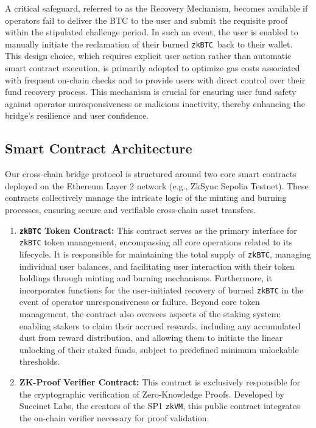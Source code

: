 \documentclass{DESSThesis}
\newcommand{\zktoken}{\texttt{zkBTC}}
\begin{document}
A critical safeguard, referred to as the Recovery Mechanism, becomes available if operators fail to deliver the BTC to the user and submit the requisite proof within the stipulated challenge period. In such an event, the user is enabled to manually initiate the reclamation of their burned \zktoken\ back to their wallet. This design choice, which requires explicit user action rather than automatic smart contract execution, is primarily adopted to optimize gas costs associated with frequent on-chain checks and to provide users with direct control over their fund recovery process. This mechanism is crucial for ensuring user fund safety against operator unresponsiveness or malicious inactivity, thereby enhancing the bridge's resilience and user confidence.



\subsection{Smart Contract Architecture} \label{subsec:smart-contract-architecture}
Our cross-chain bridge protocol is structured around two core smart contracts deployed on the Ethereum Layer 2 network (e.g., ZkSync Sepolia Testnet). These contracts collectively manage the intricate logic of the minting and burning processes, ensuring secure and verifiable cross-chain asset transfers.

\begin{enumerate}
	\item \textbf{\texttt{\zktoken} Token Contract:} This contract serves as the primary interface for \texttt{\zktoken} token management, encompassing all core operations related to its lifecycle. It is responsible for maintaining the total supply of \texttt{\zktoken}, managing individual user balances, and facilitating user interaction with their token holdings through minting and burning mechanisms. Furthermore, it incorporates functions for the user-initiated recovery of burned \texttt{\zktoken} in the event of operator unresponsiveness or failure. Beyond core token management, the contract also oversees aspects of the staking system: enabling stakers to claim their accrued rewards, including any accumulated dust from reward distribution, and allowing them to initiate the linear unlocking of their staked funds, subject to predefined minimum unlockable thresholds.
    
    \item \textbf{ZK-Proof Verifier Contract:} This contract \cite{noauthor_sp1-contractscontractssrcisp1verifiergatewaysol_nodate} is exclusively responsible for the cryptographic verification of Zero-Knowledge Proofs. Developed by Succinct Labs, the creators of the SP1 \texttt{zkVM}, this public contract integrates the on-chain verifier necessary for proof validation.
\end{enumerate}
\end{document}
